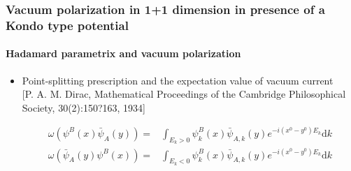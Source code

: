 \documentclass[french]{beamer}
\newcommand{\dd}[0]{\textrm{d}}
\begin{document}
\begin{frame}
\frametitle{Vacuum polarization in 1+1 dimension in presence of a Kondo type potential}
\framesubtitle{Hadamard parametrix and vacuum polarization}

\begin{itemize}


\item Point-splitting prescription and the expectation value of vacuum current
\\
\tiny\color{blue}[P. A. M. Dirac, Mathematical Proceedings of the Cambridge Philosophical Society, 30(2):150?163, 1934] \color{black}\normalsize

\begin{equation*}
\begin{split}
\omega(\psi^B(x)\bar{\psi}_A(y)) = & \int_{E_k >0} \psi_k^B(x)\bar{\psi}_{A,k}(y)e^{-i(x^0-y^0)E_k} \dd k \\
\omega(\bar{\psi}_A(y)\psi^B(x)) = & \int_{E_k <0} \psi_k^B(x)\bar{\psi}_{A,k}(y)e^{-i(x^0-y^0)E_k} \dd k 
\end{split}
\end{equation*}

\end{itemize}

\end{frame}
\end{document}
